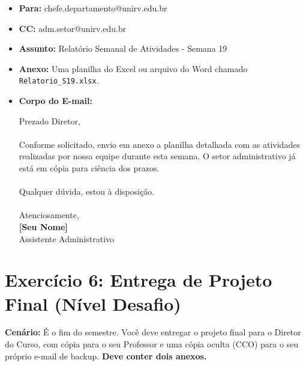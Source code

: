 \documentclass[12pt,a4paper]{article}
\begin{document}
\begin{itemize}[label=$\square$]
    \item \textbf{Para:} chefe.departamento@unirv.edu.br
    \item \textbf{CC:} adm.setor@unirv.edu.br
    \item \textbf{Assunto:} Relatório Semanal de Atividades - Semana 19
    \item \textbf{Anexo:} Uma planilha do Excel ou arquivo do Word chamado \texttt{Relatorio\_S19.xlsx}.
    \item \textbf{Corpo do E-mail:}
    \begin{tcolorbox}[colback=gray!5, colframe=gray!50]
        Prezado Diretor,\\
        \\
        Conforme solicitado, envio em anexo a planilha detalhada com as atividades realizadas por nossa equipe durante esta semana. O setor administrativo já está em cópia para ciência dos prazos.\\
        \\
        Qualquer dúvida, estou à disposição.\\
        \\
        Atenciosamente,\\
        \textbf{[Seu Nome]} \\
        Assistente Administrativo
    \end{tcolorbox}
\end{itemize}

\newpage

\section*{Exercício 6: Entrega de Projeto Final (Nível Desafio)}

\textbf{Cenário:} É o fim do semestre. Você deve entregar o projeto final para o Diretor do Curso, com cópia para o seu Professor e uma cópia oculta (CCO) para o seu próprio e-mail de backup. \textbf{Deve conter dois anexos.}
\end{document}
